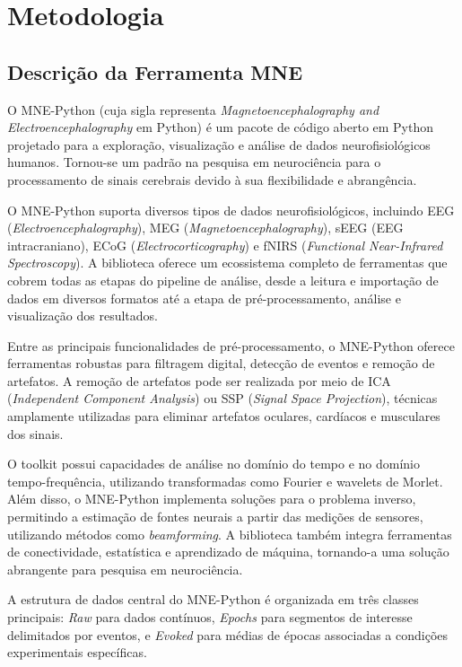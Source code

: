 \chapter{Metodologia}
\label{chap:metodologia}

\section{Descrição da Ferramenta MNE}\label{sec:exemplo-de-algoritmos-e-figuras}

    O MNE-Python (cuja sigla representa \textit{Magnetoencephalography and Electroencephalography} em Python) é um pacote de código aberto em Python projetado para a exploração, visualização e análise de dados neurofisiológicos humanos. Tornou-se um padrão na pesquisa em neurociência para o processamento de sinais cerebrais devido à sua flexibilidade e abrangência.

    O MNE-Python suporta diversos tipos de dados neurofisiológicos, incluindo EEG (\textit{Electroencephalography}), MEG (\textit{Magnetoencephalography}), sEEG (EEG intracraniano), ECoG (\textit{Electrocorticography}) e fNIRS (\textit{Functional Near-Infrared Spectroscopy}). A biblioteca oferece um ecossistema completo de ferramentas que cobrem todas as etapas do pipeline de análise, desde a leitura e importação de dados em diversos formatos até a etapa de pré-processamento, análise e visualização dos resultados.

    Entre as principais funcionalidades de pré-processamento, o MNE-Python oferece ferramentas robustas para filtragem digital, detecção de eventos e remoção de artefatos. A remoção de artefatos pode ser realizada por meio de ICA (\textit{Independent Component Analysis}) ou SSP (\textit{Signal Space Projection}), técnicas amplamente utilizadas para eliminar artefatos oculares, cardíacos e musculares dos sinais.

    O toolkit possui capacidades de análise no domínio do tempo e no domínio tempo-frequência, utilizando transformadas como Fourier e wavelets de Morlet. Além disso, o MNE-Python implementa soluções para o problema inverso, permitindo a estimação de fontes neurais a partir das medições de sensores, utilizando métodos como \textit{beamforming}. A biblioteca também integra ferramentas de conectividade, estatística e aprendizado de máquina, tornando-a uma solução abrangente para pesquisa em neurociência.

    A estrutura de dados central do MNE-Python é organizada em três classes principais: \textit{Raw} para dados contínuos, \textit{Epochs} para segmentos de interesse delimitados por eventos, e \textit{Evoked} para médias de épocas associadas a condições experimentais específicas.

